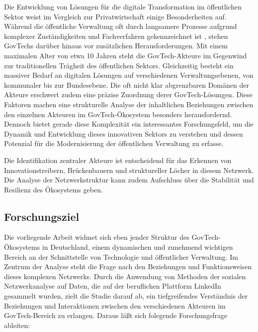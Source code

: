\documentclass[a4paper,11pt]{article}
\begin{document}
Die Entwicklung von Lösungen für die digitale Transformation im öffentlichen Sektor weist im Vergleich zur Privatwirtschaft einige Besonderheiten auf. \parencite{ThePoliticalEconomyofGovTech} Während die öffentliche Verwaltung oft durch langsamere Prozesse aufgrund komplexer Zuständigkeiten und Fachverfahren gekennzeichnet ist \parencite{Bogumil2019}, stehen GovTechs darüber hinaus vor zusätzlichen Herausforderungen. Mit einem maximalen Alter von etwa 10 Jahren steht die GovTech-Akteure im Gegenwind zur traditionellen Trägheit des öffentlichen Sektors. Gleichzeitig besteht ein massiver Bedarf an digitalen Lösungen auf verschiedenen Verwaltungsebenen, von kommunaler bis zur Bundesebene. Die oft nicht klar abgrenzbaren Domänen der Akteure erschwert zudem eine präzise Zuordnung derer GovTech-Lösungen. \parencite{ThePoliticalEconomyofGovTech} Diese Faktoren machen eine strukturelle Analyse der inhaltlichen Beziehungen zwischen den einzelnen Akteuren im GovTech-Ökosystem besonders herausfordernd. Dennoch bietet gerade diese Komplexität ein interessantes Forschungsfeld, um die Dynamik und Entwicklung dieses innovativen Sektors zu verstehen und dessen Potenzial für die Modernisierung der öffentlichen Verwaltung zu erfasse.\parencite{Haug2024}

Die Identifikation zentraler Akteure ist entscheidend für das Erkennen von Innovationstreibern, Brückenbauern und struktureller Löcher in diesem Netzwerk. Die Analyse der Netzwerkstruktur kann zudem Aufschluss über die Stabilität und Resilienz des Ökosystems geben. 

\subsection{Forschungsziel}
Die vorliegende Arbeit widmet sich eben jender Struktur des GovTech-Ökosystems in Deutschland, einem dynamischen und zunehmend wichtigen Bereich an der Schnittstelle von Technologie und öffentlicher Verwaltung. Im Zentrum der Analyse steht die Frage nach den Beziehungen und Funktionsweisen dieses komplexen Netzwerks. Durch die Anwendung von Methoden der sozialen Netzwerkanalyse auf Daten, die auf der beruflichen Plattform LinkedIn gesammelt wurden, zielt die Studie darauf ab, ein tiefgreifendes Verständnis der Beziehungen und Interaktionen zwischen den verschiedenen Akteuren im GovTech-Bereich zu erlangen. Daraus läßt sich folegende Forschungsfrage ableiten:

\end{document}
